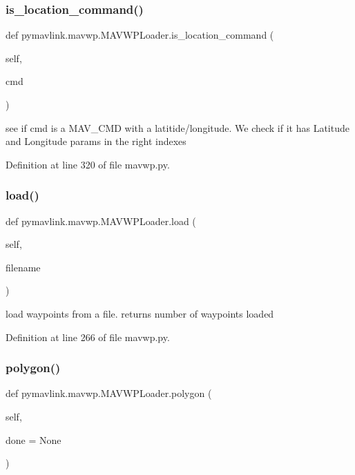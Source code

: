 \subsubsection{\texorpdfstring{is\_location\_command()}{is\_location\_command()}}
{\footnotesize\ttfamily def pymavlink.\+mavwp.\+M\+A\+V\+W\+P\+Loader.\+is\+\_\+location\+\_\+command (\begin{DoxyParamCaption}\item[{}]{self,  }\item[{}]{cmd }\end{DoxyParamCaption})}

\begin{DoxyVerb}see if cmd is a MAV_CMD with a latitide/longitude.
We check if it has Latitude and Longitude params in the right indexes\end{DoxyVerb}
 

Definition at line 320 of file mavwp.\+py.

\mbox{\label{classpymavlink_1_1mavwp_1_1MAVWPLoader_a8a7cd99d440f8a7ac8cb2892d07b900b}} 
\subsubsection{\texorpdfstring{load()}{load()}}
{\footnotesize\ttfamily def pymavlink.\+mavwp.\+M\+A\+V\+W\+P\+Loader.\+load (\begin{DoxyParamCaption}\item[{}]{self,  }\item[{}]{filename }\end{DoxyParamCaption})}

\begin{DoxyVerb}load waypoints from a file.
returns number of waypoints loaded\end{DoxyVerb}
 

Definition at line 266 of file mavwp.\+py.

\mbox{\label{classpymavlink_1_1mavwp_1_1MAVWPLoader_a200db285358c83ec7f112a1268b6c858}} 
\subsubsection{\texorpdfstring{polygon()}{polygon()}}
{\footnotesize\ttfamily def pymavlink.\+mavwp.\+M\+A\+V\+W\+P\+Loader.\+polygon (\begin{DoxyParamCaption}\item[{}]{self,  }\item[{}]{done = {\ttfamily None} }\end{DoxyParamCaption})}

